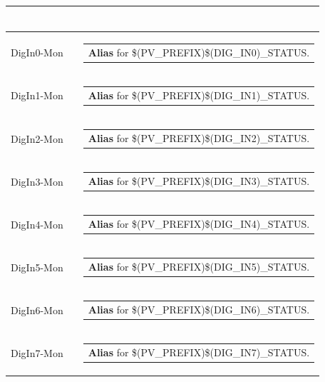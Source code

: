 \documentclass[openany]{article}
\begin{document}
\begin{longtable}{| m{4.5cm} m{2.5cm}  m{8.0cm} |}
\begin{tabular}{@{}m{6cm}@{}}
            \end{tabular} \hypertarget{}{}\\ \hline
        DigIn0-Mon &  & \begin{tabular}{@{}m{6cm}@{}}
                \textbf{Alias} for \$(PV\_PREFIX)\$(DIG\_IN0)\_STATUS.
            \end{tabular} \hypertarget{}{}\\ \hline
        DigIn1-Mon &  & \begin{tabular}{@{}m{6cm}@{}}
                \textbf{Alias} for \$(PV\_PREFIX)\$(DIG\_IN1)\_STATUS.
            \end{tabular} \hypertarget{}{}\\ \hline
        DigIn2-Mon &  & \begin{tabular}{@{}m{6cm}@{}}
                \textbf{Alias} for \$(PV\_PREFIX)\$(DIG\_IN2)\_STATUS.
            \end{tabular} \hypertarget{}{}\\ \hline
        DigIn3-Mon &  & \begin{tabular}{@{}m{6cm}@{}}
                \textbf{Alias} for \$(PV\_PREFIX)\$(DIG\_IN3)\_STATUS.
            \end{tabular} \hypertarget{}{}\\ \hline
        DigIn4-Mon &  & \begin{tabular}{@{}m{6cm}@{}}
                \textbf{Alias} for \$(PV\_PREFIX)\$(DIG\_IN4)\_STATUS.
            \end{tabular} \hypertarget{}{}\\ \hline
        DigIn5-Mon &  & \begin{tabular}{@{}m{6cm}@{}}
                \textbf{Alias} for \$(PV\_PREFIX)\$(DIG\_IN5)\_STATUS.
            \end{tabular} \hypertarget{}{}\\ \hline
        DigIn6-Mon &  & \begin{tabular}{@{}m{6cm}@{}}
                \textbf{Alias} for \$(PV\_PREFIX)\$(DIG\_IN6)\_STATUS.
            \end{tabular} \hypertarget{}{}\\ \hline
        DigIn7-Mon &  & \begin{tabular}{@{}m{6cm}@{}}
                \textbf{Alias} for \$(PV\_PREFIX)\$(DIG\_IN7)\_STATUS.
            \end{tabular} \hypertarget{}{}\\ \hline

\end{longtable}
\end{document}
